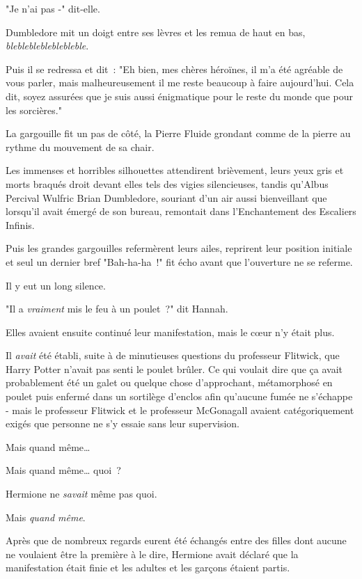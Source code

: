 "Je n'ai pas -" dit-elle.

Dumbledore mit un doigt entre ses lèvres et les remua de haut en bas, \emph{blebleblebleblebleble}.

Puis il se redressa et dit~: "Eh bien, mes chères héroïnes, il m'a été agréable de vous parler, mais malheureusement il me reste beaucoup à faire aujourd'hui. Cela dit, soyez assurées que je suis aussi énigmatique pour le reste du monde que pour les sorcières."

La gargouille fit un pas de côté, la Pierre Fluide grondant comme de la pierre au rythme du mouvement de sa chair.

Les immenses et horribles silhouettes attendirent brièvement, leurs yeux gris et morts braqués droit devant elles tels des vigies silencieuses, tandis qu'Albus Percival Wulfric Brian Dumbledore, souriant d'un air aussi bienveillant que lorsqu'il avait émergé de son bureau, remontait dans l'Enchantement des Escaliers Infinis.

Puis les grandes gargouilles refermèrent leurs ailes, reprirent leur position initiale et seul un dernier bref "Bah-ha-ha~!" fit écho avant que l'ouverture ne se referme.

Il y eut un long silence.

"Il a \emph{vraiment} mis le feu à un poulet~?" dit Hannah.

\later

Elles avaient ensuite continué leur manifestation, mais le cœur n'y était plus.

Il \emph{avait} été établi, suite à de minutieuses questions du professeur Flitwick, que Harry Potter n'avait pas senti le poulet brûler. Ce qui voulait dire que ça avait probablement été un galet ou quelque chose d'approchant, métamorphosé en poulet puis enfermé dans un sortilège d'enclos afin qu'aucune fumée ne s'échappe - mais le professeur Flitwick et le professeur McGonagall avaient catégoriquement exigés que personne ne s'y essaie sans leur supervision.

Mais quand même…

Mais quand même… quoi~?

Hermione ne \emph{savait} même pas quoi.

Mais \emph{quand même}.

Après que de nombreux regards eurent été échangés entre des filles dont aucune ne voulaient être la première à le dire, Hermione avait déclaré que la manifestation était finie et les adultes et les garçons étaient partis.

